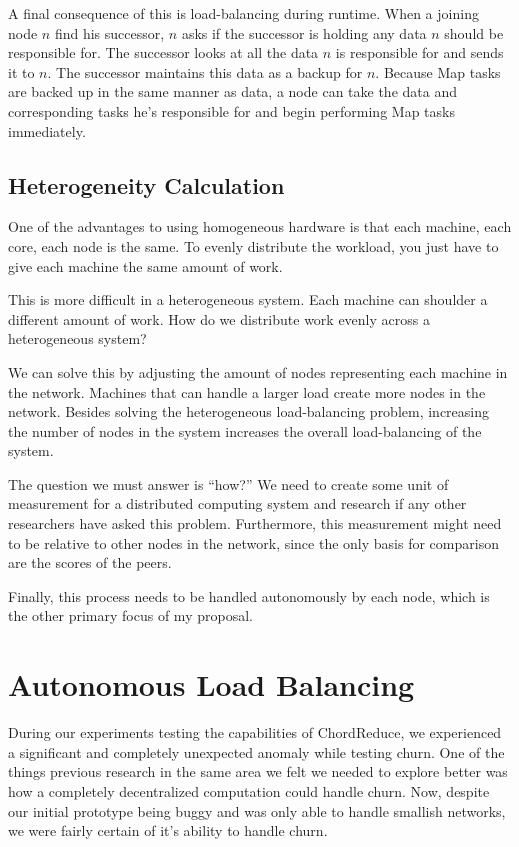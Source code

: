 A final consequence of this is load-balancing during runtime.  
When a joining node $n$ find his successor, $n$ asks if the successor is holding any data $n$ should be responsible for.  
The successor looks at all the data $n$ is responsible for and sends it to $n$.  
The successor maintains this data as a backup for $n$.  
Because Map tasks are backed up in the same manner as data, a node can take the data and corresponding tasks he's responsible for and begin performing Map tasks immediately.



\subsection{Heterogeneity Calculation}

One of the advantages to using homogeneous hardware is that each machine, each core, each node is the same.
To evenly distribute the workload, you just have to give each machine the same amount of work.

This is more difficult in a heterogeneous system.
Each machine can shoulder a different amount of work.
How do we distribute work evenly across a heterogeneous system?

We can solve this by adjusting the amount of nodes representing each machine in the network.
Machines that can handle a larger load create more nodes in the network.
Besides solving the heterogeneous load-balancing problem, increasing the number of nodes in the system increases the overall load-balancing of the system.


The question we must answer is ``how?''
We need to create some unit of measurement for a distributed computing system and research if any other researchers have asked this problem.
Furthermore, this measurement might need to be relative to other nodes in the network, since the only basis for comparison are the scores of the peers.

Finally, this process needs to be handled autonomously by each node, which is the other primary focus of my proposal.
\section{Autonomous Load Balancing}
\label{sec:auto-load-bal}


During our experiments testing the capabilities of ChordReduce, we experienced a significant and completely unexpected anomaly while testing churn.
One of the things previous research \cite{marozzo2012p2p}  \cite{leemap} in the same area we felt we needed to explore better was how a completely decentralized computation could handle churn.
Now, despite our initial prototype being buggy and was only able to handle smallish networks, we were fairly certain of it's ability to handle churn.

